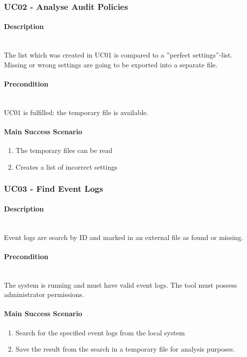 \subsubsection{UC02 - Analyse Audit Policies}
\begin{tcolorbox}
    \paragraph{Description} \ \\
    The list which was created in UC01 is compared to a ''perfect settings''-list. Missing or wrong settings are going to be exported into a separate file.
    \ \\
    \paragraph{Precondition} \ \\
    UC01 is fulfilled: the temporary file is available.
    \ \\
    \paragraph{Main Success Scenario} 
    \begin{enumerate}
        \item The temporary files can be read
        \item Creates a list of incorrect settings
    \end{enumerate}   
\end{tcolorbox}
\subsubsection{UC03 - Find Event Logs}
\begin{tcolorbox}
    \paragraph{Description} \ \\
    Event logs are search by ID and marked in an external file as found or missing.
    \ \\
    \paragraph{Precondition} \ \\
    The system is running and must have valid event logs. The tool must possess administrator permissions.
    \ \\
    \paragraph{Main Success Scenario} 
    \begin{enumerate}
        \item Search for the specified event logs from the local system
        \item Save the result from the search in a temporary file for analysis purposes.
    \end{enumerate}
\end{tcolorbox}


